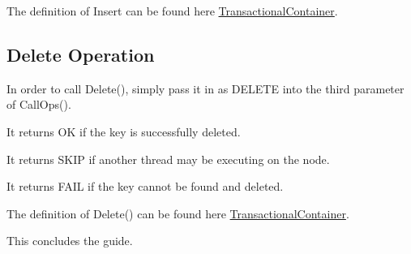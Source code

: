 The definition of Insert can be found here \hyperlink{classTransactionalContainer}{Transactional\+Container}.\hypertarget{index_using_Delete}{}\subsection{Delete Operation}\label{index_using_Delete}
In order to call Delete(), simply pass it in as D\+E\+L\+E\+TE into the third parameter of Call\+Ops().


\begin{DoxyItemize}
\item It returns OK if the key is successfully deleted.~\newline

\item It returns S\+K\+IP if another thread may be executing on the node.~\newline

\item It returns F\+A\+IL if the key cannot be found and deleted.~\newline

\end{DoxyItemize}

The definition of Delete() can be found here \hyperlink{classTransactionalContainer}{Transactional\+Container}.

This concludes the guide. 